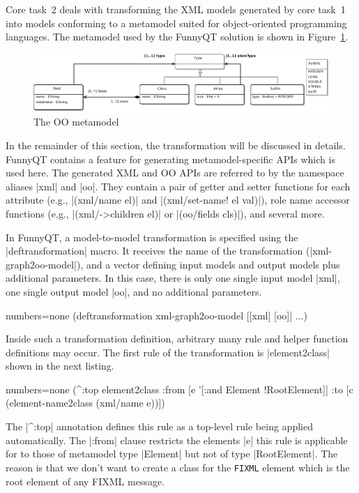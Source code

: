 \documentclass[submission]{eptcs}
\newcommand{\code}{\clojureinline}
\begin{document}
Core task~2 deals with transforming the XML models generated by core task~1
into models conforming to a metamodel suited for object-oriented programming
languages.  The metamodel used by the FunnyQT solution is shown in
Figure~\ref{fig:oo-mm}.

\begin{figure}[h!t]
  \centering
  \includegraphics[width=\textwidth]{../postproc/oo-mm}
  \caption{The OO metamodel}
  \label{fig:oo-mm}
\end{figure}

In the remainder of this section, the transformation will be discussed in
details.  FunnyQT contains a feature for generating metamodel-specific APIs
which is used here.  The generated XML and OO APIs are referred to by the
namespace aliases \code|xml| and \code|oo|.  They contain a pair of getter and
setter functions for each attribute (e.g., \code|(xml/name el)| and
\code|(xml/set-name! el val)|), role name accessor functions (e.g.,
\code|(xml/->children el)| or \code|(oo/fields cls)|), and several more.

In FunnyQT, a model-to-model transformation is specified using the
\code|deftransformation| macro.  It receives the name of the transformation
(\code|xml-graph2oo-model|), and a vector defining input models and output
models plus additional parameters.  In this case, there is only one single
input model \code|xml|, one single output model \code|oo|, and no additional
parameters.

\begin{clojurecode*}{numbers=none}
(deftransformation xml-graph2oo-model [[xml] [oo]]
  ...)
\end{clojurecode*}

Inside such a transformation definition, arbitrary many rule and helper
function definitions may occur.  The first rule of the transformation is
\code|element2class| shown in the next listing.

\begin{clojurecode*}{numbers=none}
  (^:top element2class
   :from [e '[:and Element !RootElement]]
   :to   [c (element-name2class (xml/name e))])
\end{clojurecode*}

The \code|^:top| annotation defines this rule as a top-level rule being applied
automatically.  The \code|:from| clause restricts the elements \code|e| this
rule is applicable for to those of metamodel type \code|Element| but not of
type \code|RootElement|.  The reason is that we don't want to create a class
for the \texttt{FIXML} element which is the root element of any FIXML message.
\end{document}
